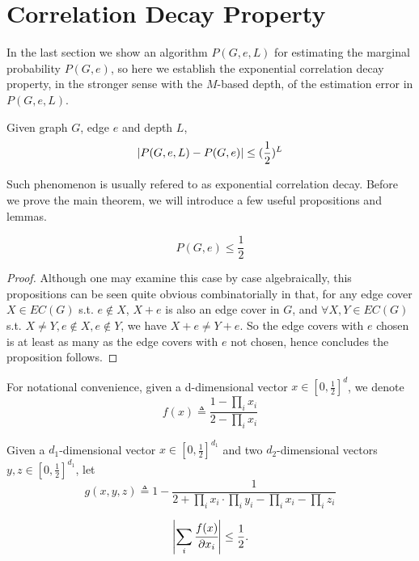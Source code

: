 \section{Correlation Decay Property}

In the last section we show an algorithm $P(G,e,L)$ for estimating the marginal probability $P(G,e)$,
so here we establish the exponential correlation decay property, in the stronger sense with the $M$-based depth, of the estimation error in $P(G,e,L)$.%

\begin{Thm}
	Given graph $G$, edge $e$ and depth $L$,
	\[\left\vert P(G,e,L) - P(G,e)\right\vert \leq (\frac{1}{2})^{L}\]
\end{Thm}

Such phenomenon is usually refered to as exponential correlation decay. Before we prove the main theorem, we will introduce a few useful propositions and lemmas.

\begin{Prop}
	\[P(G, e) \leq \frac{1}{2}\]
\end{Prop}

\begin{proof}
	Although one may examine this case by case algebraically, this propositions can be seen quite obvious combinatorially in that, for any edge cover $X \in EC(G)$ s.t. $e \notin X$, $X+e$ is also an edge cover in $G$, and $\forall X,Y \in EC(G)$ s.t. $X \neq Y, e \notin X, e\notin Y$, we have $X+e \neq Y+e$. So the edge covers with $e$ chosen is at least as many as the edge covers with $e$ not chosen, hence concludes the proposition follows.
\end{proof}

For notational convenience, given a d-dimensional vector $x \in [0, \frac{1}{2}]^d$, we denote
\[ f(x) \triangleq \frac{1- \prod_i x_i}{2 - \prod_i x_i}\]

Given a $d_1$-dimensional vector $x \in [0, \frac{1}{2}]^{d_1}$ and two $d_2$-dimensional vectors $y,z \in [0, \frac{1}{2}]^{d_1}$, let
\[ g(x,y,z) \triangleq  1- \frac{1}{2+\prod_i x_i \cdot \prod_i y_i - \prod_i x_i - \prod_i z_i} \]


	\begin{Lem}
		\begin{align*}
			\left\vert\sum_i \cfrac{f(x)}{\partial x_i}\right\vert \leq \frac{1}{2}. 
		\end{align*}
	\end{Lem}

